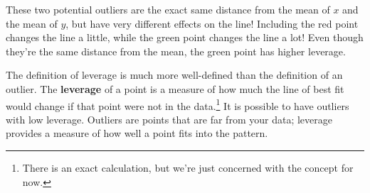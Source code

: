 \documentclass[
  letterpaper,
  DIV=11,
  numbers=noendperiod,
  oneside]{scrreprt}
\begin{document}
These two potential outliers are the exact same distance from the mean
of \(x\) and the mean of \(y\), but have very different effects on the
line! Including the red point changes the line a little, while the green
point changes the line a lot! Even though they're the same distance from
the mean, the green point has higher leverage.

The definition of leverage is much more well-defined than the definition
of an outlier. The \textbf{leverage} of a point is a measure of how much
the line of best fit would change if that point were not in the
data.\footnote{There is an exact calculation, but we're just concerned
  with the concept for now.} It is possible to have outliers with low
leverage. Outliers are points that are far from your data; leverage
provides a measure of how well a point fits into the pattern.
\end{document}
